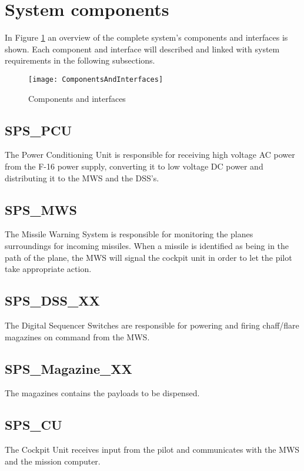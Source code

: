\documentclass[Main]{subfiles}
\begin{document}
\section{System components}

In Figure \ref{fig:ComponentsAndInterfaces} an overview of the complete system's components and interfaces is shown.
Each component and interface will described and linked with system requirements in the following subsections.

\begin{figure}[H]
\centering
\texttt{[image: ComponentsAndInterfaces]}
\caption{Components and interfaces}
\label{fig:ComponentsAndInterfaces}
\end{figure}

\subsection{SPS\_PCU}
The Power Conditioning Unit is responsible for receiving high voltage AC power from the F-16 power supply, converting it to low voltage DC power and distributing it to the MWS and the DSS's.

\subsection{SPS\_MWS}
The Missile Warning System is responsible for monitoring the planes surroundings for incoming missiles.
When a missile is identified as being in the path of the plane, the MWS will signal the cockpit unit in order to let the pilot take appropriate action.

\subsection{SPS\_DSS\_XX}
The Digital Sequencer Switches are responsible for powering and firing chaff/flare magazines on command from the MWS.

\subsection{SPS\_Magazine\_XX}
The magazines contains the payloads to be dispensed.

\subsection{SPS\_CU}
The Cockpit Unit receives input from the pilot and communicates with the MWS and the mission computer.
\end{document}
